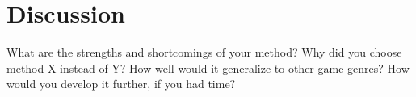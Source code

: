 \section{Discussion}
\label{06}

What are the strengths and shortcomings of your method? Why did you choose method X instead of Y? How well would it generalize to other game genres? How would you develop it further, if you had time?